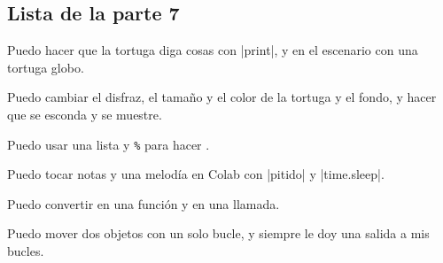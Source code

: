 \subsection*{Lista de la parte 7}

\tick Puedo hacer que la tortuga diga cosas con \py|print|, y en el escenario con una tortuga globo.\par
\tick Puedo cambiar el disfraz, el tamaño y el color de la tortuga y el fondo, y hacer que se esconda y se muestre.\par
\tick Puedo usar una lista y \texttt{\%} para hacer .\par
\tick Puedo tocar notas y una melodía en Colab con \py|pitido| y \py|time.sleep|.\par
\tick Puedo convertir  en una función y  en una llamada.\par
\tick Puedo mover dos objetos con un solo bucle, y siempre le doy una salida a mis bucles.
